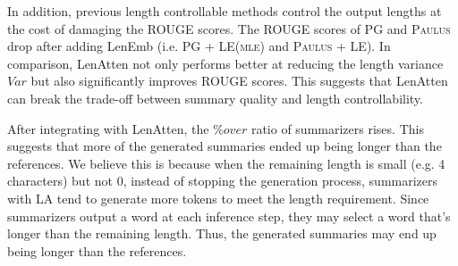 \documentclass[11pt,a4paper]{article}
\begin{document}
In addition, previous length controllable methods control the output lengths at the cost of damaging the ROUGE scores. The ROUGE scores of \textsc{PG} and \textsc{Paulus} drop after adding LenEmb (i.e. \textsc{PG + LE(mle)} and \textsc{Paulus + LE}). In comparison, LenAtten not only performs better at reducing the length variance $Var$ but also significantly improves ROUGE scores. This suggests that LenAtten can break the trade-off between summary quality and length controllability.

After integrating with LenAtten, the $\%over$ ratio of summarizers rises. This suggests that more of the generated summaries ended up being longer than the references. We believe this is because when the remaining length is small (e.g. 4 characters) but not 0, instead of stopping the generation process, summarizers with LA tend to generate more tokens to meet the length requirement. Since summarizers output a word at each inference step, they may select a word that's longer than the remaining length. Thus, the generated summaries may end up being longer than the references.
\end{document}
